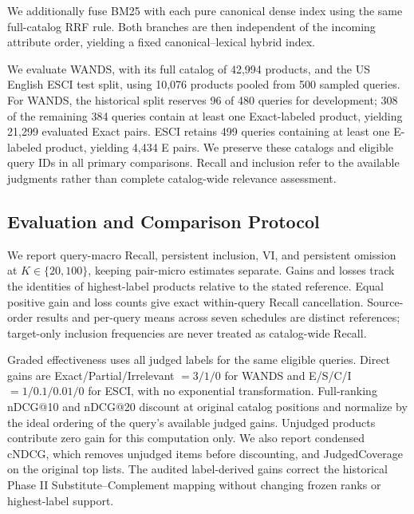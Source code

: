 
We additionally fuse BM25 with each pure canonical dense index using the same full-catalog RRF rule. Both branches are then independent of the incoming attribute order, yielding a fixed canonical--lexical hybrid index.

We evaluate WANDS, with its full catalog of 42,994 products, and the US English ESCI test split, using 10,076 products pooled from 500 sampled queries. For WANDS, the historical split reserves 96 of 480 queries for development; 308 of the remaining 384 queries contain at least one Exact-labeled product, yielding 21,299 evaluated Exact pairs. ESCI retains 499 queries containing at least one E-labeled product, yielding 4,434 E pairs. We preserve these catalogs and eligible query IDs in all primary comparisons. Recall and inclusion refer to the available judgments rather than complete catalog-wide relevance assessment.

\subsection{Evaluation and Comparison Protocol}
\label{sec:evaluation_protocol}

We report query-macro Recall, persistent inclusion, VI, and persistent omission at $K\in\{20,100\}$, keeping pair-micro estimates separate. Gains and losses track the identities of highest-label products relative to the stated reference. Equal positive gain and loss counts give exact within-query Recall cancellation. Source-order results and per-query means across seven schedules are distinct references; target-only inclusion frequencies are never treated as catalog-wide Recall.

Graded effectiveness uses all judged labels for the same eligible queries. Direct gains are Exact/Partial/Irrelevant $=3/1/0$ for WANDS and E/S/C/I $=1/0.1/0.01/0$ for ESCI, with no exponential transformation. Full-ranking nDCG@10 and nDCG@20 discount at original catalog positions and normalize by the ideal ordering of the query's available judged gains. Unjudged products contribute zero gain for this computation only. We also report condensed cNDCG, which removes unjudged items before discounting, and JudgedCoverage on the original top lists. The audited label-derived gains correct the historical Phase II Substitute--Complement mapping without changing frozen ranks or highest-label support.

